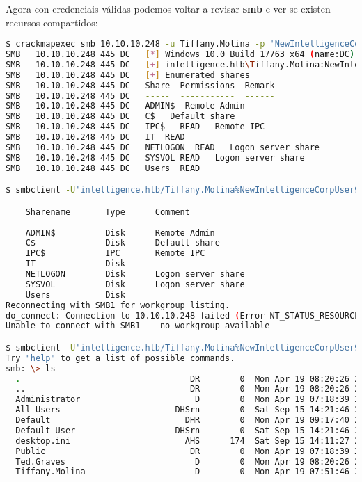 \documentclass[a4paper]{article}
\begin{document}
Agora con credenciais válidas podemos voltar a revisar \textbf{smb} e ver se existen recursos compartidos:
        \begin{lstlisting}[language=Bash, caption=Recursos compartidos, linewidth=18.7cm]
$ crackmapexec smb 10.10.10.248 -u Tiffany.Molina -p 'NewIntelligenceCorpUser9876' --shares
SMB   10.10.10.248 445 DC   [*] Windows 10.0 Build 17763 x64 (name:DC) (domain:intelligence.htb) (signing:True) (SMBv1:False)
SMB   10.10.10.248 445 DC   [+] intelligence.htb\Tiffany.Molina:NewIntelligenceCorpUser9876 
SMB   10.10.10.248 445 DC   [+] Enumerated shares
SMB   10.10.10.248 445 DC   Share  Permissions  Remark
SMB   10.10.10.248 445 DC   -----  -----------  ------
SMB   10.10.10.248 445 DC   ADMIN$  Remote Admin
SMB   10.10.10.248 445 DC   C$   Default share
SMB   10.10.10.248 445 DC   IPC$   READ   Remote IPC
SMB   10.10.10.248 445 DC   IT  READ   
SMB   10.10.10.248 445 DC   NETLOGON  READ   Logon server share 
SMB   10.10.10.248 445 DC   SYSVOL READ   Logon server share 
SMB   10.10.10.248 445 DC   Users  READ   

$ smbclient -U'intelligence.htb/Tiffany.Molina%NewIntelligenceCorpUser9876'  -L //10.10.10.248

	Sharename       Type      Comment
	---------       ----      -------
	ADMIN$          Disk      Remote Admin
	C$              Disk      Default share
	IPC$            IPC       Remote IPC
	IT              Disk
	NETLOGON        Disk      Logon server share
	SYSVOL          Disk      Logon server share
	Users           Disk
Reconnecting with SMB1 for workgroup listing.
do_connect: Connection to 10.10.10.248 failed (Error NT_STATUS_RESOURCE_NAME_NOT_FOUND)
Unable to connect with SMB1 -- no workgroup available

$ smbclient -U'intelligence.htb/Tiffany.Molina%NewIntelligenceCorpUser9876'  //10.10.10.248/Users
Try "help" to get a list of possible commands.
smb: \> ls
  .                                  DR        0  Mon Apr 19 08:20:26 2021
  ..                                 DR        0  Mon Apr 19 08:20:26 2021
  Administrator                       D        0  Mon Apr 19 07:18:39 2021
  All Users                       DHSrn        0  Sat Sep 15 14:21:46 2018
  Default                           DHR        0  Mon Apr 19 09:17:40 2021
  Default User                    DHSrn        0  Sat Sep 15 14:21:46 2018
  desktop.ini                       AHS      174  Sat Sep 15 14:11:27 2018
  Public                             DR        0  Mon Apr 19 07:18:39 2021
  Ted.Graves                          D        0  Mon Apr 19 08:20:26 2021
  Tiffany.Molina                      D        0  Mon Apr 19 07:51:46 2021


\end{lstlisting}
\end{document}
